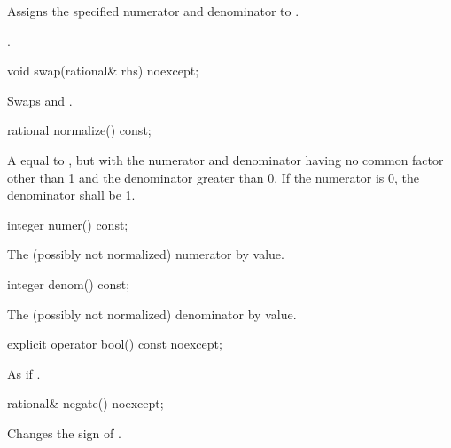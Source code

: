 \begin{addedblock}
\begin{itemdescr}
\effects Assigns the specified numerator and denominator to .

\returns {}.
\end{itemdescr}

\begin{itemdecl}
void swap(rational& rhs) noexcept;
\end{itemdecl}

\begin{itemdescr}
\effects Swaps  and .
\end{itemdescr}

\begin{itemdecl}
rational normalize() const;
\end{itemdecl}

\begin{itemdescr}
\returns A  equal to , but with the numerator and denominator having no common factor other than 1 and the denominator greater than 0. If the numerator is 0, the denominator shall be 1.
\end{itemdescr}

\begin{itemdecl}
integer numer() const;
\end{itemdecl}

\begin{itemdescr}
\returns The (possibly not normalized) numerator by value.
\end{itemdescr}

\begin{itemdecl}
integer denom() const;
\end{itemdecl}

\begin{itemdescr}
\returns The (possibly not normalized) denominator by value.
\end{itemdescr}

\begin{itemdecl}
explicit operator bool() const noexcept;
\end{itemdecl}

\begin{itemdescr}
\returns As if .
\end{itemdescr}

\begin{itemdecl}
rational& negate() noexcept;
\end{itemdecl}

\begin{itemdescr}
\effects Changes the sign of .


\end{itemdescr}
\end{addedblock}
